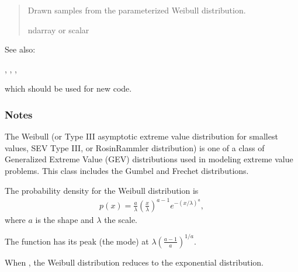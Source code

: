 \documentclass[letterpaper,10pt,english]{sphinxmanual}
\begin{document}
\begin{fulllineitems}
\begin{quote}
\begin{description}
\begin{itemize}
\end{itemize}

\sphinxAtStartPar
{} \textendash{} Drawn samples from the parameterized Weibull distribution.

\sphinxAtStartPar
ndarray or scalar

\end{description}\end{quote}


\begin{sphinxseealso}{See also:}

\sphinxAtStartPar
{}, , , {\hyperref[\detokenize{metilda.controllers:metilda.controllers.pitch_art_wizard.gumbel}]{}}
\begin{description}
\sphinxAtStartPar
which should be used for new code.

\end{description}


\end{sphinxseealso}

\subsubsection*{Notes}

\sphinxAtStartPar
The Weibull (or Type III asymptotic extreme value distribution
for smallest values, SEV Type III, or Rosin\sphinxhyphen{}Rammler
distribution) is one of a class of Generalized Extreme Value
(GEV) distributions used in modeling extreme value problems.
This class includes the Gumbel and Frechet distributions.

\sphinxAtStartPar
The probability density for the Weibull distribution is
\begin{equation*}
\begin{split}p(x) = \frac{a}
{\lambda}(\frac{x}{\lambda})^{a-1}e^{-(x/\lambda)^a},\end{split}
\end{equation*}
\sphinxAtStartPar
where \(a\) is the shape and \(\lambda\) the scale.

\sphinxAtStartPar
The function has its peak (the mode) at
\(\lambda(\frac{a-1}{a})^{1/a}\).

\sphinxAtStartPar
When , the Weibull distribution reduces to the exponential
distribution.

\end{fulllineitems}
\end{document}
